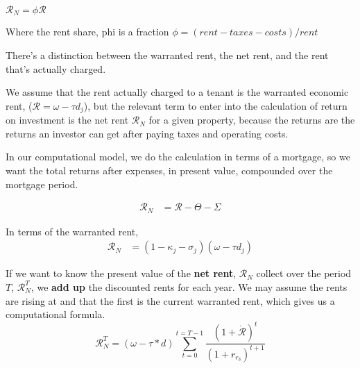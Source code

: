 $\mathcal{R}_N = \phi \mathcal{R}$

Where the \gls{rent share}, phi is a fraction
$\phi = (rent-taxes-costs) /rent$ 

There's a distinction between the warranted rent, the net rent, and the rent that's actually charged.

We assume that the  rent  actually charged to a tenant is the warranted economic rent, ($\mathcal{R}= \omega - \tau d_j$), but the relevant term to enter into the calculation of return on investment is the net rent $\mathcal{R}_N$ for a given property, because the returns are the returns an investor can get after paying taxes and operating costs.

In our computational model, we do the calculation in terms of a mortgage, so we want the total returns after expenses, in present value, compounded over the mortgage  period.

\begin{align}
\mathcal{R}_N &= \mathcal{R} - \Theta - \Sigma 
\end{align}

In terms of the warranted rent, 
\begin{align}
\mathcal{R}_N &= (1-\kappa_j - \sigma_j)(\omega - \tau d_j)
\end{align}



If we want to know the  present value  of the \textbf{net rent}, $\mathcal{R}_N$  collect over the period  $T$, $\mathcal{R}_N^T$, we \textbf{add up} the discounted rents for each year. We may assume the rents are rising at and that the first is the current warranted rent, which gives us a computational formula. 
\[\mathcal{R}_N^T= (\omega-\tau*d)\sum_{t=0}^{t=T-1} \frac{(1+\dot{\mathcal{R}})^{t}} {(1+r_{r_\delta})^{t+1}} \]

